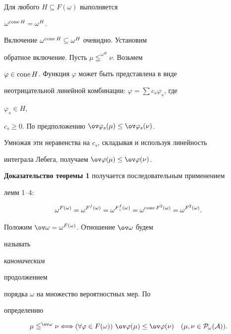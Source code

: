 


\begin{lem} 


Для любого $H\subseteq F(\omega)$ выполняется 


$\omega^{\operatorname{cone} H}=\omega^H$. 


\end{lem} 


 


\begin{pf} 


Включение $\omega^{\operatorname{cone} H}\subseteq\omega^H$ очевидно. Установим 


обратное включение. Пусть $\mu\leqq^{\omega^H}\nu$. Возьмем 


$\varphi\in\operatorname{cone} H$. Функция $\varphi$ может быть представлена в виде 


неотрицательной линейной комбинации: $\varphi=\sum c_s\varphi_s$, где 


$\varphi_s\in H$, 


$c_s\ge0$. По предположению $\ov\varphi_s(\mu)\le\ov\varphi_s(\nu)$. 


Умножая эти неравенства на $c_s$, складывая и используя линейность 


интеграла Лебега, получаем $\ov\varphi(\mu)\le\ov\varphi(\nu)$. 


\end{pf} 


 


{\bf Доказательство теоремы 1} получается последовательным применением 


лемм 1--4: 


$$ 


\omega^{F(\omega)}=\omega^{F^f(\omega)}= 


\omega^{F^f_+(\omega)}=\omega^{\cone F^2(\omega)}= 


\omega^{F^2(\omega)}. 


$$ 


 


Положим $\ov\omega=\omega^{F(\omega)}$. Отношение $\ov\omega$ будем 


называть {\em каноническим 


продолжением} порядка $\omega$ на множество вероятностных мер. По 


определению 


\begin{equation} 


\mu\leqq^{\ov\omega}\nu\Longleftrightarrow 


(\forall\varphi\in F(\omega))\ \ov\varphi(\mu)\le 


\ov\varphi(\nu)\quad (\mu,\nu\in\cal P_\omega(A)). 


\end{equation} 


